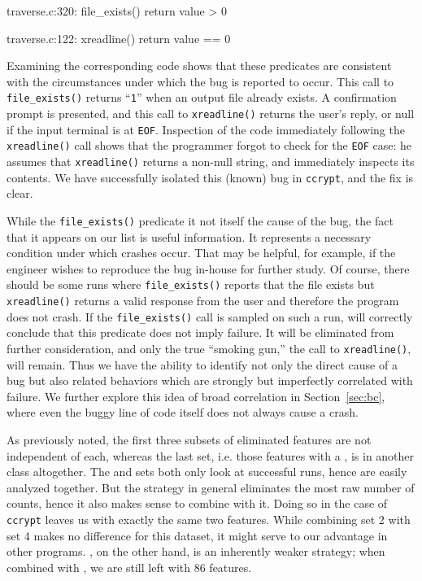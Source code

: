 \begin{features}
\item traverse.c:320: file\_exists() return value > 0
\item traverse.c:122: xreadline() return value == 0
\end{features}

Examining the corresponding code shows that these predicates are
consistent with the circumstances under which the bug is reported to
occur.  This call to \texttt{file\_exists()} returns ``{\tt 1}'' when an output
file already exists.  A confirmation prompt is presented, and this
call to \texttt{xreadline()} returns the user's reply, or null if the
input terminal is at \texttt{EOF}.  Inspection of the code immediately
following the \texttt{xreadline()} call shows that the programmer
forgot to check for the \texttt{EOF} case: he assumes that
\texttt{xreadline()} returns a non-null string, and immediately
inspects its contents.  We have successfully isolated this (known) bug
in \texttt{ccrypt}, and the fix is clear.

While the \texttt{file\_exists()} predicate it not itself the cause of
the bug, the fact that it appears on our list is useful information.
It represents a necessary condition under which crashes occur.  That
may be helpful, for example, if the engineer wishes to reproduce the
bug in-house for further study.  Of course, there should be some runs
where \texttt{file\_exists()} reports that the file exists but
\texttt{xreadline()} returns a valid response from the user and
therefore the program does not crash.  If the \texttt{file\_exists()}
call is sampled on such a run,  will correctly conclude that this predicate does not
imply failure.  It will be eliminated from further consideration, and
only the true ``smoking gun,'' the call to \texttt{xreadline()}, will
remain.  Thus we have the ability to identify not only the direct
cause of a bug but also related behaviors which are strongly but
imperfectly correlated with failure.  We further explore this idea of
broad correlation in Section~\ref{sec:bc}, where even the buggy line
of code itself does not always cause a crash.

As previously noted, the first three subsets of eliminated features
are not independent of each, whereas the last set, i.e. those features
with a , is in another class altogether.
The  and 
sets both only look at successful runs, hence are easily analyzed
together.  But the  strategy in general
eliminates the most raw number of counts, hence it also makes sense to
combine  with it.  Doing so in the
case of \texttt{ccrypt} leaves us with exactly the same two features.
While combining set 2 with set 4 makes no difference for this dataset,
it might serve to our advantage in other programs.  , on the other hand, is an inherently
weaker strategy; when combined with ,
we are still left with 86 features.

